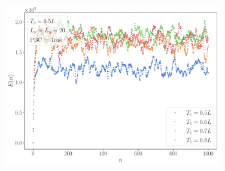 \documentclass[11pt, a4paper]{article}
\theoremstyle{definition} %
\begin{document}
\begin{figure}
\centering
\includegraphics[width = 0.85\textwidth]{TotalEnergyHeating2d_Multiple}
\caption{}
\end{figure}
%
\end{document}
